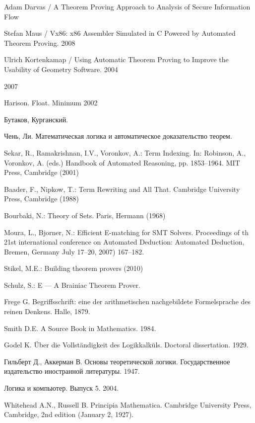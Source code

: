\begin{thebibliography}{99}
 Adam Darvas / A Theorem Proving Approach to Analysis of Secure Information Flow 

 Stefan Maus / Vx86: x86 Assembler Simulated in C Powered by Automated Theorem Proving. 2008

 Ulrich Kortenkamap / Using Automatic Theorem Proving to Improve the Usability of Geometry Software. 2004

 2007

 Harison. Float. Minimum 2002

 Бутаков, Курганский.

 Чень, Ли. Математическая логика и автоматическое доказательство теорем.

 Sekar, R., Ramakrishnan, I.V., Voronkov, A.: Term Indexing. In: Robinson, A., Voronkov, A. (eds.) Handbook of Automated Reasoning, pp. 1853--1964. MIT Press, Cambridge (2001)

 Baader, F., Nipkow, T.: Term Rewriting and All That. Cambridge University Press, Cambridge (1988)

 Bourbaki, N.: Theory of Sets. Paris, Hermann (1968)

 Moura, L., Bjorner, N.: Efficient E-matching for SMT Solvers. Proceedings of th 21st international conference on Automated Deduction: Automated Deduction, Bremen, Germany July 17--20, 2007) 167--182.

 Stikel, M.E.: Building theorem provers (2010)

 Schulz, S.: E --- A Brainiac Theorem Prover.

 Frege G. Begriffsschrift: eine der arithmetischen nachgebildete Formelsprache des reinen Denkens. Halle, 1879.

 Smith D.E. A Source Book in Mathematics. 1984.

 Godel K. Über die Vollständigkeit des Logikkalküls. Doctoral dissertation. 1929.

 Гильберт Д., Аккерман В. Основы теоретической логики. Государственное издательство иностранной литературы. 1947.

 Логика и компьютер. Выпуск 5. 2004.

 Whitehead A.N., Russell B. Principia Mathematica. Cambridge University Press, Cambridge, 2nd edition (January 2, 1927).


\end{thebibliography}
